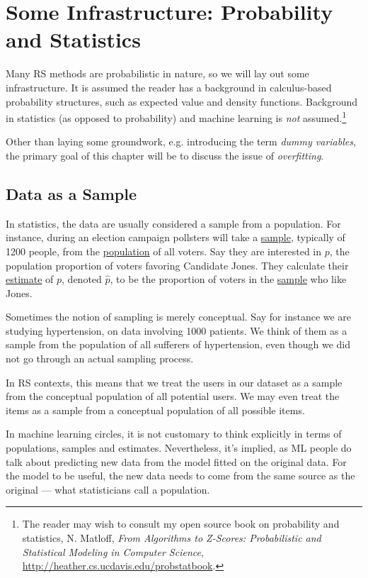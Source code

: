 \chapter{Some Infrastructure:  
Probability and Statistics}
\label{chap:infra2}   

Many RS methods are probabilistic in nature, so we will lay out some
infrastructure.  It is assumed the reader has a background in
calculus-based probability structures, such as expected value and
density functions.  Background in statistics (as opposed to probability)
and machine learning is \textit{not} assumed.\footnote{The reader may
wish to consult my open source book on probability and statistics, N.
Matloff, \textit{From Algorithms to Z-Scores: Probabilistic and
Statistical Modeling in Computer Science},
\url{http://heather.cs.ucdavis.edu/probstatbook}.}

Other than laying some groundwork, e.g. introducing the term
\textit{dummy variables}, the primary goal of this chapter will be to
discuss the issue of \textit{overfitting}.

\section{Data as a Sample}

In statistics, the data are usually considered a sample from a
population.  For instance, during an election campaign pollsters will
take a \underline{sample}, typically of 1200 people, from the
\underline{population} of all voters.  Say they are interested in $p$,
the population proportion of voters favoring Candidate Jones. They
calculate their \underline{estimate} of $p$, denoted $\widehat{p}$, to
be the proportion of voters in the \underline{sample} who like Jones.

Sometimes the notion of sampling is merely conceptual. Say for instance
we are studying hypertension, on data involving 1000 patients.  We think
of them as a sample from the population of all sufferers of
hypertension, even though we did not go through an actual sampling
process.

In RS contexts, this means that we treat the users in our dataset as a
sample from the conceptual population of all potential users.  We may
even treat the items as a sample from a conceptual population of all
possible items.

In machine learning circles, it is not customary to think explicitly in
terms of populations, samples and estimates.  Nevertheless, it's
implied, as ML people do talk about predicting new data from the model
fitted on the original data.  For the model to be useful, the new data
needs to come from the same source as the original --- what
statisticians call a population.

